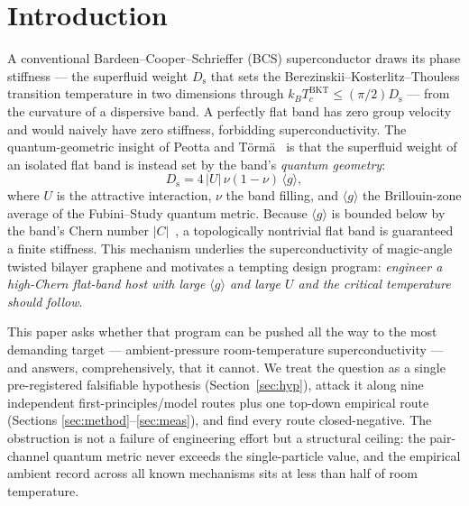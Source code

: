 \documentclass[11pt,a4paper]{article}
\newcommand{\qgg}{\langle g \rangle}
\newcommand{\Ds}{D_{\mathrm{s}}}
\begin{document}
\section{Introduction}
A conventional Bardeen--Cooper--Schrieffer (BCS) superconductor draws its phase stiffness --- the
superfluid weight $\Ds$ that sets the Berezinskii--Kosterlitz--Thouless transition temperature in
two dimensions through $k_B T_c^{\mathrm{BKT}} \le (\pi/2)\Ds$ --- from the curvature of a
dispersive band. A perfectly flat band has zero group velocity and would naively have zero
stiffness, forbidding superconductivity. The quantum-geometric insight of Peotta and
T\"orm\"a~\citep{peotta2015} is that the superfluid weight of an isolated flat band is instead set
by the band's \emph{quantum geometry}:
\begin{equation}
  \Ds = 4\,|U|\,\nu(1-\nu)\,\qgg,
  \label{eq:peotta}
\end{equation}
where $U$ is the attractive interaction, $\nu$ the band filling, and $\qgg$ the Brillouin-zone
average of the Fubini--Study quantum metric. Because $\qgg$ is bounded below by the band's Chern
number $|C|$~\citep{peotta2015,herzog2022}, a topologically nontrivial flat band is guaranteed a
finite stiffness. This mechanism underlies the superconductivity of magic-angle twisted bilayer
graphene and motivates a tempting design program: \emph{engineer a high-Chern flat-band host with
large $\qgg$ and large $U$ and the critical temperature should follow}.

This paper asks whether that program can be pushed all the way to the most demanding target ---
ambient-pressure room-temperature superconductivity --- and answers, comprehensively, that it
cannot. We treat the question as a single pre-registered falsifiable hypothesis (Section~\ref{sec:hyp}),
attack it along nine independent first-principles/model routes plus one top-down empirical route
(Sections \ref{sec:method}--\ref{sec:meas}), and find every route closed-negative. The obstruction
is not a failure of engineering effort but a structural ceiling: the pair-channel quantum metric
never exceeds the single-particle value, and the empirical ambient record across all known
mechanisms sits at less than half of room temperature.
\end{document}
